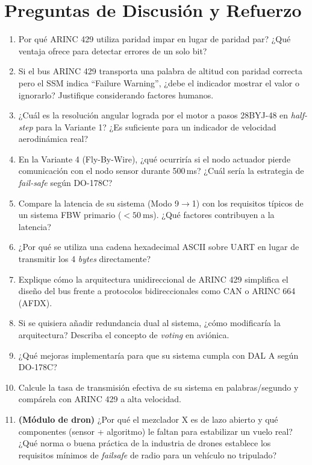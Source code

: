 \documentclass[11pt]{article}
\begin{document}
\section{Preguntas de Discusión y Refuerzo}
\begin{enumerate}
  \item Por qué ARINC 429 utiliza paridad impar en lugar de paridad par? ¿Qué ventaja
        ofrece para detectar errores de un solo bit?
  \item Si el bus ARINC 429 transporta una palabra de altitud con paridad correcta pero
        el SSM indica ``Failure Warning'', ¿debe el indicador mostrar el valor o
        ignorarlo? Justifique considerando factores humanos.
  \item ¿Cuál es la resolución angular lograda por el motor a pasos 28BYJ-48 en
        \emph{half-step} para la Variante 1? ¿Es suficiente para un indicador de
        velocidad aerodinámica real?
  \item En la Variante 4 (Fly-By-Wire), ¿qué ocurriría si el nodo actuador pierde
        comunicación con el nodo sensor durante 500\,ms? ¿Cuál sería la estrategia de
        \emph{fail-safe} según DO-178C?
  \item Compare la latencia de su sistema (Modo 9$\to$1) con los requisitos típicos de
        un sistema FBW primario ($<\SI{50}{\milli\second}$). ¿Qué factores contribuyen a
        la latencia?
  \item ¿Por qué se utiliza una cadena hexadecimal ASCII sobre UART en lugar de
        transmitir los 4 \emph{bytes} directamente?
  \item Explique cómo la arquitectura unidireccional de ARINC 429 simplifica el diseño
        del bus frente a protocolos bidireccionales como CAN o ARINC 664 (AFDX).
  \item Si se quisiera añadir redundancia dual al sistema, ¿cómo modificaría la
        arquitectura? Describa el concepto de \emph{voting} en aviónica.
  \item ¿Qué mejoras implementaría para que su sistema cumpla con DAL A según DO-178C?
  \item Calcule la tasa de transmisión efectiva de su sistema en palabras/segundo y
        compárela con ARINC 429 a alta velocidad.
  \item \textbf{(Módulo de dron)} ¿Por qué el mezclador X es de lazo abierto y qué
        componentes (sensor + algoritmo) le faltan para estabilizar un vuelo real? ¿Qué
        norma o buena práctica de la industria de drones establece los requisitos
        mínimos de \emph{failsafe} de radio para un vehículo no tripulado?
\end{enumerate}
\end{document}
